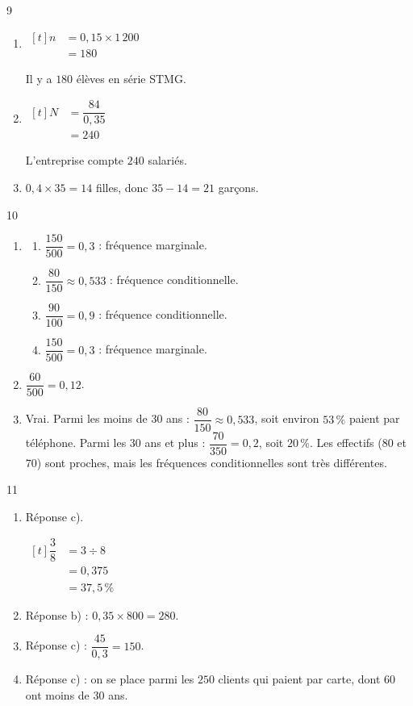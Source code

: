 \documentclass[10pt,a4paper]{article}
\begin{document}
\begin{corr}{9}
\begin{enumerate}[leftmargin=*]
    \item \(\begin{aligned}[t] n&=0,15\times 1\,200\\ &=180\end{aligned}\)

    Il y a \(180\) élèves en série STMG.
    \item \(\begin{aligned}[t] N&=\dfrac{84}{0,35}\\ &=240\end{aligned}\)

    L'entreprise compte \(240\) salariés.
    \item \(0,4\times 35=14\) filles, donc \(35-14=21\) garçons.
\end{enumerate}
\end{corr}

\begin{corr}{10}
\begin{enumerate}[leftmargin=*]
    \item \begin{enumerate}
        \item \(\dfrac{150}{500}=0,3\) : fréquence marginale.
        \item \(\dfrac{80}{150}\approx 0,533\) : fréquence conditionnelle.
        \item \(\dfrac{90}{100}=0,9\) : fréquence conditionnelle.
        \item \(\dfrac{150}{500}=0,3\) : fréquence marginale.
    \end{enumerate}
    \item \(\dfrac{60}{500}=0,12\).
    \item Vrai. Parmi les moins de 30 ans : \(\dfrac{80}{150}\approx 0,533\), soit environ \(53\,\%\) paient par téléphone. Parmi les 30 ans et plus : \(\dfrac{70}{350}=0,2\), soit \(20\,\%\). Les effectifs (\(80\) et \(70\)) sont proches, mais les fréquences conditionnelles sont très différentes.
\end{enumerate}
\end{corr}

\begin{corr}[QCM]{11}
\begin{enumerate}[leftmargin=*]
    \item Réponse c).

    \(\begin{aligned}[t] \dfrac{3}{8}&=3\div 8\\ &=0,375\\ &=37,5\,\%\end{aligned}\)
    \item Réponse b) : \(0,35\times 800=280\).
    \item Réponse c) : \(\dfrac{45}{0,3}=150\).
    \item Réponse c) : on se place parmi les \(250\) clients qui paient par carte, dont \(60\) ont moins de 30 ans.
\end{enumerate}
\end{corr}
\end{document}
